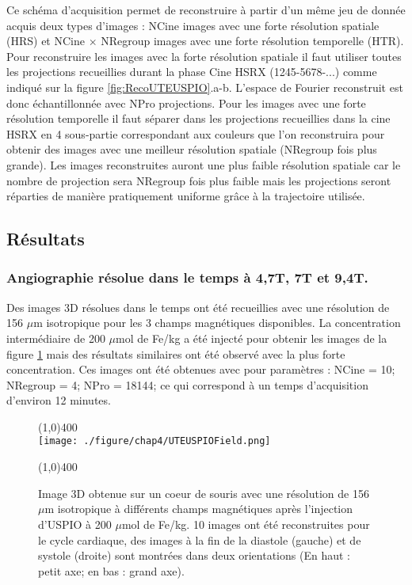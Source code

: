 Ce schéma d'acquisition permet de reconstruire à partir d'un même jeu de donnée acquis deux types d'images : NCine images avec une forte résolution spatiale (HRS) et NCine $\times$ NRegroup images avec une forte résolution temporelle (HTR). Pour reconstruire les images avec la forte résolution spatiale il faut utiliser toutes les projections recueillies durant la phase Cine HSRX (1245-5678-...) comme indiqué sur la figure \ref{fig:RecoUTEUSPIO}.a-b. L'espace de Fourier reconstruit est donc échantillonnée avec NPro projections.
Pour les images avec une forte résolution temporelle il faut séparer dans les projections recueillies dans la cine HSRX en 4 sous-partie correspondant aux couleurs que l'on reconstruira pour obtenir des images avec une meilleur résolution spatiale (NRegroup fois plus grande). Les images reconstruites auront une plus faible résolution spatiale car le nombre de projection sera NRegroup fois plus faible mais les projections seront réparties de manière pratiquement uniforme grâce à la trajectoire utilisée.

\subsection{Résultats}

\subsubsection{Angiographie résolue dans le temps à 4,7T, 7T et 9,4T.}

Des images 3D résolues dans le temps ont été recueillies avec une résolution de 156 $\mu$m isotropique pour les 3 champs magnétiques disponibles. La concentration intermédiaire de 200 $\mu$mol de Fe/kg a été injecté pour obtenir les images de la figure \ref{fig:UTEUSPIOField} mais des résultats similaires ont été observé avec la plus forte concentration. Ces images ont été obtenues avec pour paramètres : NCine = 10; NRegroup = 4; NPro = 18144; ce qui correspond à un temps d'acquisition d'environ 12 minutes.

\begin{figure}[H]
\centering
\line(1,0){400} \\
\texttt{[image: ./figure/chap4/UTEUSPIOField.png]}
\caption[Images résolution 0,156 mm]{\label{fig:UTEUSPIOField} Image 3D obtenue sur un coeur de souris avec une résolution de 156 $\mu$m isotropique à différents champs magnétiques après l'injection d'USPIO à 200 $\mu$mol de Fe/kg. 10 images ont été reconstruites pour le cycle cardiaque, des images à la fin de la diastole (gauche) et de systole (droite) sont montrées dans deux orientations (En haut : petit axe; en bas : grand axe).}
\line(1,0){400} \\ 
\end{figure}

